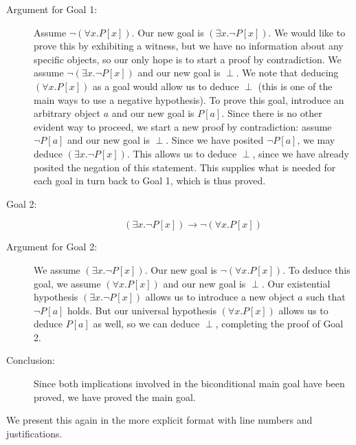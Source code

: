 \documentclass[12pt]{book}
\begin{document}
\begin{description}
\begin{description}
\item[Argument for Goal 1:] Assume $\neg (\forall x.P[x])$.  Our new
goal is $(\exists x.\neg P[x])$.  We would like to prove this by
exhibiting a witness, but we have no information about any specific
objects, so our only hope is to start a proof by contradiction.  We
assume $\neg(\exists x.\neg P[x])$ and our new goal is $\perp$.  We note that deducing $(\forall x.P[x])$ as a goal
would allow us to deduce $\perp$ (this is one of the main ways to use
a negative hypothesis).  To prove this goal, introduce an arbitrary
object $a$ and our new goal is $P[a]$.  Since there is no other
evident way to proceed, we start a new proof by contradiction: assume
$\neg P[a]$ and our new goal is $\perp$.  Since we have
posited $\neg P[a]$, we may deduce $(\exists x.\neg P[x])$.  This
allows us to deduce $\perp$, since we have already posited the negation of
this statement.  This supplies what is needed for each goal in turn
back to Goal 1, which is thus proved.

\item[Goal 2:] $$(\exists x.\neg P[x])\rightarrow \neg (\forall
x.P[x])$$


\item[Argument for Goal 2:]


We assume $(\exists x.\neg P[x])$.  Our new goal is $\neg(\forall
x.P[x])$.  To deduce this goal, we assume $(\forall x.P[x])$ and our
new goal is $\perp$.  Our existential hypothesis $(\exists
x.\neg P[x])$ allows us to introduce a new object $a$ such that $\neg
P[a]$ holds.  But our universal hypothesis $(\forall x.P[x])$ allows
us to deduce $P[a]$ as well, so we can deduce $\perp$,
completing the proof of Goal 2.

\item[Conclusion:] Since both implications involved in the
biconditional main goal have been proved, we have proved the main
goal.

\end{description}

\end{description}

\newpage

We present this again in the more explicit format with line numbers and justifications.
\end{document}
